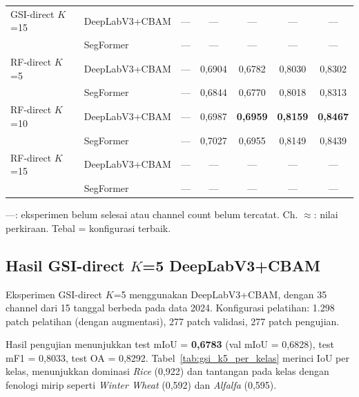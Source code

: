 \begin{table}[H]
{\begin{tabular}{|l|l|c|c|c|c|c|}
    GSI-direct $K$=15         & DeepLabV3+CBAM & --- & --- & --- & --- & --- \\
                               & SegFormer      & --- & --- & --- & --- & --- \\
    \hline
    RF-direct $K$=5           & DeepLabV3+CBAM & --- & 0,6904 & 0,6782 & 0,8030 & 0,8302 \\
                               & SegFormer      & --- & 0,6844 & 0,6770 & 0,8018 & 0,8313 \\
    \hline
    RF-direct $K$=10          & DeepLabV3+CBAM & --- & 0,6987 & \textbf{0,6959} & \textbf{0,8159} & \textbf{0,8467} \\
                               & SegFormer      & --- & 0,7027 & 0,6955 & 0,8149 & 0,8439 \\
    \hline
    RF-direct $K$=15          & DeepLabV3+CBAM & --- & --- & --- & --- & --- \\
                               & SegFormer      & --- & --- & --- & --- & --- \\
    \hline
    \end{tabular}%
    }
    \par\smallskip
    {\footnotesize ---: eksperimen belum selesai atau channel count belum tercatat. Ch. $\approx$: nilai perkiraan. Tebal = konfigurasi terbaik.}
\end{table}

\subsection{Hasil GSI-direct $K$=5 DeepLabV3+CBAM}

Eksperimen GSI-direct $K$=5 menggunakan DeepLabV3+CBAM, dengan 35 channel dari 15 tanggal berbeda pada data 2024.
Konfigurasi pelatihan: 1.298 patch pelatihan (dengan augmentasi), 277 patch validasi, 277 patch pengujian.

Hasil pengujian menunjukkan test mIoU = \textbf{0,6783} (val mIoU = 0,6828), test mF1 = 0,8033, test OA = 0,8292.
Tabel~\ref{tab:gsi_k5_per_kelas} merinci IoU per kelas, menunjukkan dominasi \textit{Rice} (0,922) dan tantangan pada kelas dengan fenologi mirip seperti \textit{Winter Wheat} (0,592) dan \textit{Alfalfa} (0,595).

